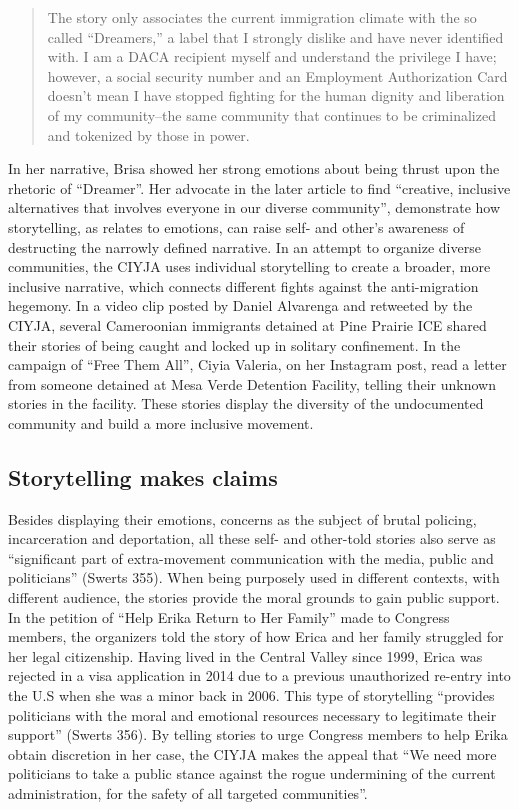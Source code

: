 \documentclass[12pt]{article}
\begin{document}
\begin{flushleft}
\begin{quotation}
    \noindent
    The story only associates the current immigration climate with the so called ``Dreamers,'' a label that I strongly dislike and have never identified with.
    I am a DACA recipient myself and understand the privilege I have; however, a social security number and an Employment Authorization Card doesn't mean I have stopped fighting for the human dignity and liberation of my community--the same community that continues to be criminalized and tokenized by those in power.
\end{quotation} %

In her narrative, Brisa showed her strong emotions about being thrust upon the rhetoric of ``Dreamer''. 
Her advocate in the later article to find ``creative, inclusive alternatives that involves everyone in our diverse community'', demonstrate how storytelling, as relates to emotions, can raise self- and other's awareness of destructing the narrowly defined narrative. 
In an attempt to organize diverse communities, the CIYJA uses individual storytelling to create a broader, more inclusive narrative, which connects different fights against the anti-migration hegemony.
In a video clip posted by Daniel Alvarenga and retweeted by the CIYJA, several Cameroonian immigrants detained at Pine Prairie ICE shared their stories of being caught and locked up in solitary confinement. %
In the campaign of ``Free Them All'', Ciyia Valeria, on her Instagram post, read a letter from someone detained at Mesa Verde Detention Facility, telling their unknown stories in the facility. %
These stories display the diversity of the undocumented community and build a more inclusive movement.

\subsection*{Storytelling makes claims}

Besides displaying their emotions, concerns as the subject of brutal policing, incarceration and deportation, all these self- and other-told stories also serve as ``significant part of extra-movement communication with the media, public and politicians'' (Swerts 355). %
When being purposely used in different contexts, with different audience, the stories provide the moral grounds to gain public support.
In the petition of ``Help Erika Return to Her Family'' made to Congress members, the organizers told the story of how Erica and her family struggled for her legal citizenship. 
Having lived in the Central Valley since 1999, Erica was rejected in a visa application in 2014 due to a previous unauthorized re-entry into the U.S when she was a minor back in 2006.
This type of storytelling ``provides politicians with the moral and emotional resources necessary to legitimate their support'' (Swerts 356).
By telling stories to urge Congress members to help Erika obtain discretion in her case, the CIYJA makes the appeal that ``We need more politicians to take a public stance against the rogue undermining of the current administration, for the safety of all targeted communities''. 


\end{flushleft}
\end{document}

